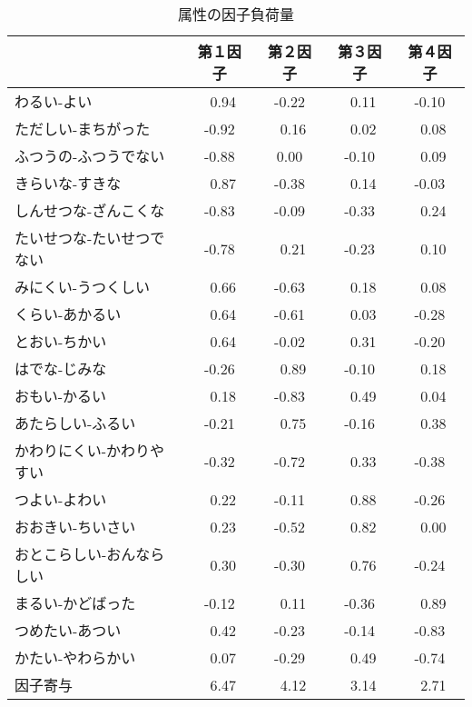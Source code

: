 \begin{table}[htbp]
   \begin{center}
      \leavevmode
      \begin{tabular}{|l|cccc|}\hline
                          & 第１因子 & 第２因子 & 第３因子 & 第４因子\\ \hline
              わるい-よい &   \ 0.94 &    -0.22 &   \ 0.11 &    -0.10\\
      ただしい-まちがった &    -0.92 &   \ 0.16 &   \ 0.02 &   \ 0.08\\
    ふつうの-ふつうでない &    -0.88 &     0.00 &    -0.10 &   \ 0.09\\
          きらいな-すきな &   \ 0.87 &    -0.38 &   \ 0.14 &    -0.03\\
    しんせつな-ざんこくな &    -0.83 &    -0.09 &    -0.33 &   \ 0.24\\
たいせつな-たいせつでない &    -0.78 &   \ 0.21 &    -0.23 &   \ 0.10\\
      みにくい-うつくしい &   \ 0.66 &    -0.63 &   \ 0.18 &   \ 0.08\\
          くらい-あかるい &   \ 0.64 &    -0.61 &   \ 0.03 &    -0.28\\
            とおい-ちかい &   \ 0.64 &    -0.02 &   \ 0.31 &    -0.20\\ \hline
            はでな-じみな &    -0.26 &   \ 0.89 &    -0.10 &   \ 0.18\\
            おもい-かるい &   \ 0.18 &    -0.83 &   \ 0.49 &   \ 0.04\\
        あたらしい-ふるい &    -0.21 &   \ 0.75 &    -0.16 &   \ 0.38\\
かわりにくい-かわりやすい &    -0.32 &    -0.72 &   \ 0.33 &    -0.38\\ \hline
            つよい-よわい &   \ 0.22 &    -0.11 &   \ 0.88 &    -0.26\\
        おおきい-ちいさい &   \ 0.23 &    -0.52 &   \ 0.82 &   \ 0.00\\
おとこらしい-おんならしい &   \ 0.30 &    -0.30 &   \ 0.76 &    -0.24\\ \hline
        まるい-かどばった &    -0.12 &   \ 0.11 &    -0.36 &   \ 0.89\\
          つめたい-あつい &   \ 0.42 &    -0.23 &    -0.14 &    -0.83\\
        かたい-やわらかい &   \ 0.07 &    -0.29 &   \ 0.49 &    -0.74\\ \hline
                 因子寄与 &   \ 6.47 &   \ 4.12 &   \ 3.14 &   \ 2.71\\ \hline
       \end{tabular}
   \end{center}
   \caption{属性の因子負荷量}
   \label{tab:Floading}
\end{table}

